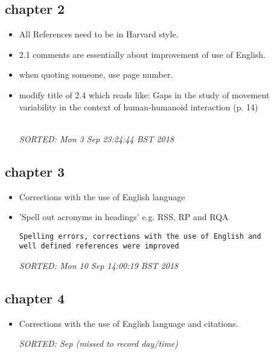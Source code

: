 \documentclass[10pt]{article}
\begin{document}
\subsection{chapter 2}

\begin{itemize}[noitemsep,topsep=0pt]
\item All References need to be in Harvard style.
 
\item 2.1 comments are essentially about improvement of use of English.

\item when quoting someone, use page number.

\item modify title of 2.4 which reads like:
	Gaps in the study of movement variability in the context of 
	human-humanoid interaction (p. 14)


\textit{
\\
SORTED:  Mon  3 Sep 23:24:44 BST 2018
}



\end{itemize}

\subsection{chapter 3}

\begin{itemize}[noitemsep,topsep=0pt]


\item Corrections with the use of English language

\item 'Spell out acronyms in headings'
	e.g. RSS, RP and RQA

\begin{verbatim}
Spelling errors, corrections with the use of English and
well defined references were improved
\end{verbatim}
\textit{
SORTED: Mon 10 Sep 14:00:19 BST 2018
}
\\




\end{itemize}

\subsection{chapter 4}

\begin{itemize}[noitemsep,topsep=0pt]
\item Corrections with the use of English language
	and citations.

\textit{
SORTED: Sep (missed to record day/time)
}

\end{itemize}
\end{document}
